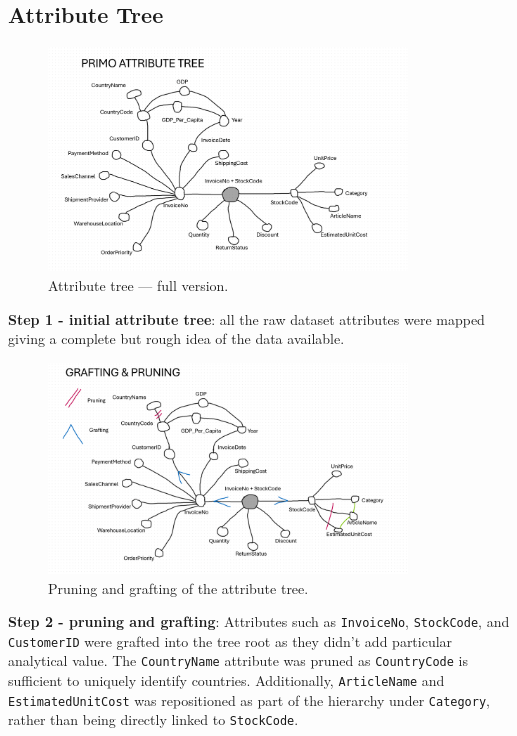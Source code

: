 \documentclass[a4paper,11pt]{article}
\begin{document}
\subsection{Attribute Tree}
\begin{figure}[H]
\centering
\includegraphics[width=0.85\textwidth]{../Graphs/1_Attribute_Tree.png}
\caption{Attribute tree — full version.}
\label{fig:attribute_tree_full}
\end{figure}

\textbf{Step 1 - initial attribute tree}: all the raw dataset attributes were mapped giving a complete but rough idea of the data available. 

\begin{figure}[H]
\centering
\includegraphics[width=0.85\textwidth]{../Graphs/2_Attribute_Tree_Pruning_Grafting.png}
\caption{Pruning and grafting of the attribute tree.}
\label{fig:attribute_tree_pruning_grafting}
\end{figure}

\textbf{Step 2 - pruning and grafting}: Attributes such as \texttt{InvoiceNo}, \texttt{StockCode}, and \texttt{CustomerID} were grafted into the tree root as they didn't add particular analytical value.
The \texttt{CountryName} attribute was pruned as \texttt{CountryCode} is sufficient to uniquely identify countries.
Additionally, \texttt{ArticleName} and \texttt{EstimatedUnitCost} was repositioned as part of the hierarchy under \texttt{Category}, rather than being directly linked to \texttt{StockCode}.
\end{document}
